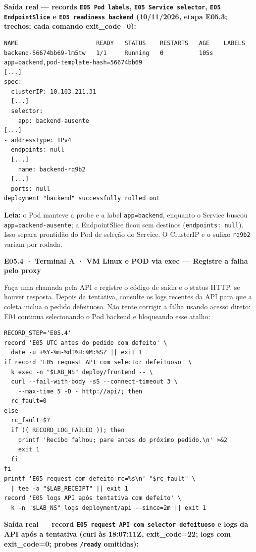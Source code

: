 \documentclass[12pt,openany,oneside,a4paper,chapter=TITLE,english,brazil]{abntex2}
\begin{document}
\textbf{Saída real --- records \texttt{E05 Pod labels}, \texttt{E05 Service selector}, \texttt{E05 Endpoint\allowbreak{}Slice} e \texttt{E05 readiness backend} (10/11/2026, etapa E05.3; trechos; cada comando exit\_code=0):}

\begin{verbatim}
NAME                      READY   STATUS    RESTARTS   AGE    LABELS
backend-56674bb69-lm5tw   1/1     Running   0          105s   app=backend,pod-template-hash=56674bb69
[...]
spec:
  clusterIP: 10.103.211.31
  [...]
  selector:
    app: backend-ausente
[...]
- addressType: IPv4
  endpoints: null
  [...]
    name: backend-rq9b2
  [...]
  ports: null
deployment "backend" successfully rolled out
\end{verbatim}

\textbf{Leia:} o Pod manteve a probe e a label \texttt{app=\allowbreak{}backend}, enquanto o Service buscou \texttt{app=\allowbreak{}backend-{}\allowbreak{}ausente}; a EndpointSlice ficou sem destinos (\texttt{endpoints:\allowbreak{} null}). Isso separa prontidão do Pod de seleção do Service. O ClusterIP e o sufixo \texttt{rq9b2} variam por rodada.

\textbf{E05.4 · Terminal A · VM Linux e POD via exec --- Registre a falha pelo proxy}

Faça uma chamada pela API e registre o código de saída e o status HTTP, se houver resposta. Depois da tentativa, consulte os logs recentes da API para que a coleta inclua o pedido defeituoso. Não tente corrigir a falha usando acesso direto: E04 continua selecionando o Pod backend e bloqueando esse atalho:

\begin{verbatim}
RECORD_STEP='E05.4'
record 'E05 UTC antes do pedido com defeito' \
  date -u +%Y-%m-%dT%H:%M:%SZ || exit 1
if record 'E05 request API com selector defeituoso' \
  k exec -n "$LAB_NS" deploy/frontend -- \
  curl --fail-with-body -sS --connect-timeout 3 \
    --max-time 5 -D - http://api/; then
  rc_fault=0
else
  rc_fault=$?
  if (( RECORD_LOG_FAILED )); then
    printf 'Recibo falhou; pare antes do próximo pedido.\n' >&2
    exit 1
  fi
fi
printf 'E05 request com defeito rc=%s\n' "$rc_fault" \
  | tee -a "$LAB_RECEIPT" || exit 1
record 'E05 logs API após tentativa com defeito' \
  k -n "$LAB_NS" logs deployment/api --since=2m || exit 1
\end{verbatim}

\textbf{Saída real --- record \texttt{E05 request API com selector defeituoso} e logs da API após a tentativa (curl às 18:07:11Z, exit\_code=22; logs com exit\_code=0; probes \texttt{/\allowbreak{}ready} omitidas):}
\end{document}
